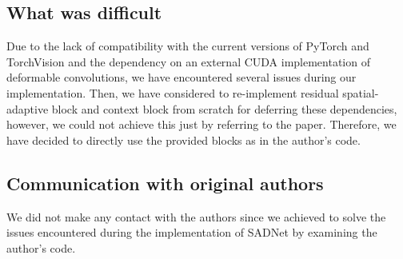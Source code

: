 \subsection{What was difficult}

Due to the lack of compatibility with the current versions of PyTorch and TorchVision and the dependency on an external CUDA implementation of deformable convolutions, we have encountered several issues during our implementation. Then, we have considered to re-implement residual spatial-adaptive block and context block from scratch for deferring these dependencies, however, we could not achieve this just by referring to the paper. Therefore, we have decided to directly use the provided blocks as in the author's code. 

\subsection{Communication with original authors}

We did not make any contact with the authors since we achieved to solve the issues encountered during the implementation of SADNet by examining the author's code. 
